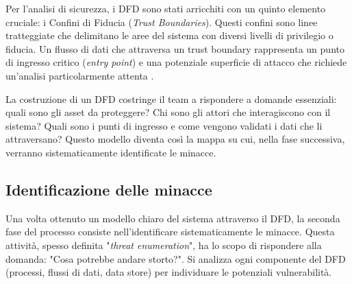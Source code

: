 Per l'analisi di sicurezza, i DFD sono stati arricchiti con un quinto elemento cruciale: i Confini di Fiducia (\textit{Trust Boundaries}). Questi confini sono linee tratteggiate che delimitano le aree del sistema con diversi livelli di privilegio o fiducia. Un flusso di dati che attraversa un trust boundary rappresenta un punto di ingresso critico (\textit{entry point}) e una potenziale superficie di attacco che richiede un'analisi particolarmente attenta \cite{STRIDE-paper}.


La costruzione di un DFD costringe il team a rispondere a domande essenziali: quali sono gli asset da proteggere? Chi sono gli attori che interagiscono con il sistema? Quali sono i punti di ingresso e come vengono validati i dati che li attraversano? Questo modello diventa così la mappa su cui, nella fase successiva, verranno sistematicamente identificate le minacce.



\subsection{Identificazione  delle minacce}




Una volta ottenuto un modello chiaro del sistema attraverso il DFD, la seconda fase del processo consiste nell'identificare sistematicamente le minacce. Questa attività, spesso definita "\textit{threat enumeration}", ha lo scopo di rispondere alla domanda: "Cosa potrebbe andare storto?". Si analizza ogni componente del DFD (processi, flussi di dati, data store) per individuare le potenziali vulnerabilità.


